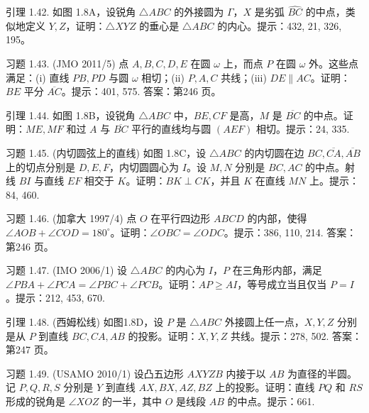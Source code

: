\begin{exercise}
    引理 1.42. 如图 1.8A，设锐角 $\triangle ABC$ 的外接圆为 $\Gamma$，$X$ 是劣弧 $\widehat{BC}$ 的中点，类似地定义 $Y, Z$，证明：$\triangle XYZ$ 的垂心是 $\triangle ABC$ 的内心。提示：432, 21, 326, 195。
\end{exercise}

\begin{exercise}
    习题 1.43. (JMO 2011/5) 点 $A, B, C, D, E$ 在圆 $\omega$ 上，而点 $P$ 在圆 $\omega$ 外。这些点满足：(i) 直线 $PB, PD$ 与圆 $\omega$ 相切；(ii) $P, A, C$ 共线；(iii) $DE \parallel AC$。证明：$BE$ 平分 $\overline{AC}$。提示：401, 575. 答案：第246 页。
\end{exercise}

\begin{exercise}
    引理 1.44. 如图 1.8B，设锐角 $\triangle ABC$ 中，$BE, CF$ 是高，$M$ 是 $\overline{BC}$ 的中点。证明：$ME, MF$ 和过 $A$ 与 $\overline{BC}$ 平行的直线均与圆 $(AEF)$ 相切。提示：24, 335.
\end{exercise}

\begin{exercise}
    习题 1.45. (内切圆弦上的直线) 如图 1.8C，设 $\triangle ABC$ 的内切圆在边 $BC, \overline{CA}, \overline{AB}$ 上的切点分别是 $D, E, F$，内切圆圆心为 $I$。设 $M, N$ 分别是 $BC, AC$ 的中点。射线 $BI$ 与直线 $EF$ 相交于 $K$。证明：$BK \perp CK$，并且 $K$ 在直线 $MN$ 上。提示：84, 460.
\end{exercise}


\begin{exercise}
    习题 1.46. (加拿大 1997/4) 点 $O$ 在平行四边形 $ABCD$ 的内部，使得 $\angle AOB + \angle COD = 180^\circ$。证明：$\angle OBC = \angle ODC$。提示：386, 110, 214. 答案：第246 页。
\end{exercise}

\begin{exercise}
    习题 1.47. (IMO 2006/1) 设 $\triangle ABC$ 的内心为 $I$，$P$ 在三角形内部，满足 $\angle PBA + \angle PCA = \angle PBC + \angle PCB$。证明：$AP \geq AI$，等号成立当且仅当 $P = I$。提示：212, 453, 670.
\end{exercise}

\begin{exercise}
    引理 1.48. (西姆松线) 如图1.8D，设 $P$ 是 $\triangle ABC$ 外接圆上任一点，$X, Y, Z$ 分别是从 $P$ 到直线 $BC, CA, AB$ 的投影。证明：$X, Y, Z$ 共线。提示：278, 502. 答案：第247 页。
\end{exercise}


\begin{exercise}
    习题 1.49. (USAMO 2010/1) 设凸五边形 $AXYZB$ 内接于以 $AB$ 为直径的半圆。记 $P, Q, R, S$ 分别是 $Y$ 到直线 $AX, BX, AZ, BZ$ 上的投影。证明：直线 $PQ$ 和 $RS$ 形成的锐角是 $\angle XOZ$ 的一半，其中 $O$ 是线段 $AB$ 的中点。提示：661.
\end{exercise}

